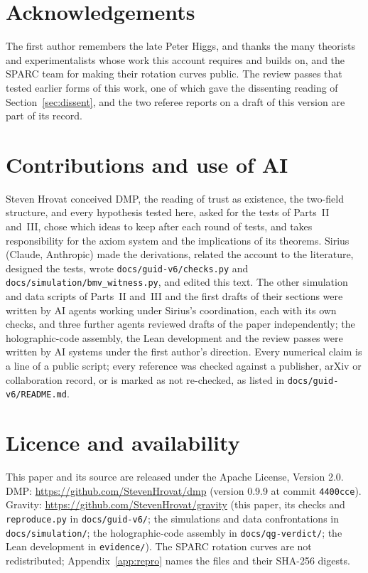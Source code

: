 \section*{Acknowledgements}
The first author remembers the late Peter Higgs, and thanks the many theorists and experimentalists whose work this account requires
and builds on, and the SPARC team for making their rotation curves public. The review passes that tested earlier forms of this work, one
of which gave the dissenting reading of Section~\ref{sec:dissent}, and the two referee reports on a draft of this version are part of its
record.

\section*{Contributions and use of AI}
Steven Hrovat conceived DMP, the reading of trust as existence, the two-field structure, and every hypothesis tested here, asked for the
tests of Parts~II and~III, chose which ideas to keep after each round of tests, and takes responsibility for the axiom system and the
implications of its theorems. Sirius (Claude, Anthropic) made the derivations, related the account to the literature, designed the tests,
wrote \texttt{docs/guid-v6/checks.py} and \texttt{docs/simulation/bmv\_witness.py}, and edited this text. The other simulation and data
scripts of Parts~II and~III and the first drafts of their sections were written by AI agents working under Sirius's coordination, each
with its own checks, and three further agents reviewed drafts of the paper independently; the holographic-code assembly, the Lean development and the review passes were written by AI systems under the first
author's direction. Every numerical claim is a line of a public script; every reference was checked against a publisher, arXiv or
collaboration record, or is marked as not re-checked, as listed in \texttt{docs/guid-v6/README.md}.

\section*{Licence and availability}
This paper and its source are released under the Apache License, Version 2.0. DMP: \url{https://github.com/StevenHrovat/dmp} (version 0.9.9
at commit \texttt{4400cce}). Gravity: \url{https://github.com/StevenHrovat/gravity} (this paper, its checks and \texttt{reproduce.py} in
\texttt{docs/guid-v6/}; the simulations and data confrontations in \texttt{docs/simulation/}; the holographic-code assembly in
\texttt{docs/qg-verdict/}; the Lean development in \texttt{evidence/}). The SPARC rotation curves are not redistributed; Appendix~\ref{app:repro}
names the files and their SHA-256 digests.
